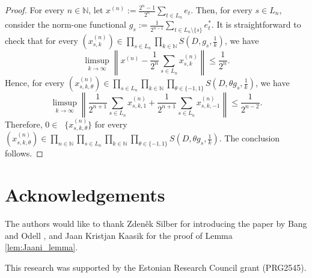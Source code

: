 \documentclass[11pt,a4paper,reqno]{amsart}
\numberwithin{equation}{section}
\newcommand{\norm}[1]{\left\lVert#1\right\rVert}
\newcommand{\N}{\mathbb{N}}
\DeclareMathOperator{\cconv}{\overline{conv}}
\newcommand{\1}{\mathbbm{1}}
\renewcommand{\leq}{\leqslant}
\theoremstyle{plain}
\theoremstyle{definition}
\begin{document}
\begin{proof}
   For every $n\in\N$, let $x^{(n)}:=\frac{2^n-1}{2^n}\sum_{t\in L_n}e_t$. Then, for every $s\in L_n$, consider the norm-one functional $g_s:=\frac{1}{2^{n-1}}\sum_{t\in L_n\setminus\{s\}}e_t^*$. It is straightforward to check that for every $(x_{s,k}^{(n)})\in\prod_{s\in L_n}\prod_{k\in\N}S(D,g_s,\frac{1}{k})$, we have \begin{equation*}
        \limsup_{k\to \infty}\norm{x^{(n)}-\frac{1}{2^n}\sum_{s\in L_n}x_{s,k}^{(n)}}\leq \frac{1}{2^n}.
    \end{equation*} Hence, for every $(x_{s,k,\theta}^{(n)})\in \prod_{s\in L_n}\prod_{k\in\N}\prod_{\theta\in\{-1,1\}}S(D,\theta g_s,\frac{1}{k})$, we have \begin{equation*}
        \limsup_{k\to\infty} \norm{\frac{1}{2^{n+1}}\sum_{s\in L_n}x_{s,k,1}^{(n)}+\frac{1}{2^{n+1}}\sum_{s\in L_n}x_{s,k,-1}^{(n)}}\leq \frac{1}{2^{n-2}}.
    \end{equation*} Therefore, $0\in\cconv\{x_{s,k,\theta}^{(n)}\}$ for every $(x_{s,k,\theta}^{(n)})\in\prod_{n\in\N}\prod_{s\in L_n}\prod_{k\in\N}\prod_{\theta\in\{-1,1\}} S(D,\theta g_s,\frac{1}{k})$. The conclusion follows. 
\end{proof}


\section*{Acknowledgements}
The authors would like to thank Zdeněk Silber for introducing the paper by Bang and Odell \cite{BO89}, and Jaan Kristjan Kaasik for the proof of Lemma \ref{lem:Jaani_lemma}.

This research was supported by the Estonian Research Council grant (PRG2545).
\end{document}
